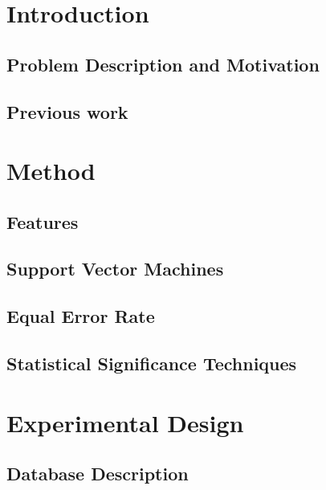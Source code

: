 \documentclass[11pt,a4paper]{tesis}
\begin{document}
\linespread{1.6}
\tableofcontents
\chapter{Introduction}
	\section{Problem Description and Motivation}
	\section{Previous work}
		
\chapter{Method}
	
	\section{Features}
		
		
		
	\section{Support Vector Machines}
		
	\section{Equal Error Rate}
		
	\section{Statistical Significance Techniques}
		
		

\chapter{Experimental Design}
	
	\section{Database Description}
		
\end{document}
